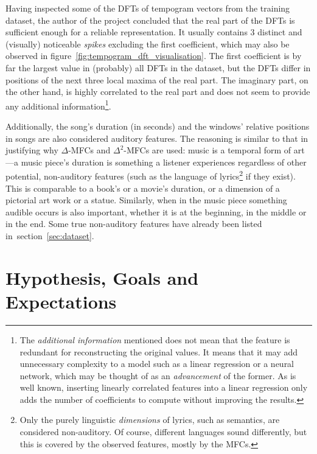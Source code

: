 \documentclass[conference, a4paper, 12pt]{IEEEtran}
\begin{document}
    \par

    Having inspected some of the DFTs of tempogram vectors from the training dataset, the author of the project concluded that the real part of the DFTs is sufficient enough for a reliable representation. It usually contains $ 3 $ distinct and (visually) noticeable \emph{spikes} excluding the first coefficient, which may also be observed in figure~\ref{fig:tempogram_dft_visualisation}. The first coefficient is by far the largest value in (probably) all DFTs in the dataset, but the DFTs differ in positions of the next three local maxima of the real part. The imaginary part, on the other hand, is highly correlated to the real part and does not seem to provide any additional information\footnote{The \emph{additional information} mentioned does not mean that the feature is redundant for reconstructing the original values. It means that it may add unnecessary complexity to a model such as a linear regression or a neural network, which may be thought of as an \emph{advancement} of the former. As is well known, inserting linearly correlated features into a linear regression only adds the number of coefficients to compute without improving the results.}.

    \par

    Additionally, the song's duration (in seconds) and the windows' relative positions in songs are also considered auditory features. The reasoning is similar to that in justifying why $ \Delta $-MFCs and $ \Delta^{2} $-MFCs are used: music is a temporal form of art---a music piece's duration is something a listener experiences regardless of other potential, non-auditory features (such as the language of lyrics\footnote{Only the purely linguistic \emph{dimensions} of lyrics, such as semantics, are considered non-auditory. Of course, different languages sound differently, but this is covered by the observed features, mostly by the MFCs.} if they exist). This is comparable to a book's or a movie's duration, or a dimension of a pictorial art work or a statue. Similarly, when in the music piece something audible occurs is also important, whether it is at the beginning, in the middle or in the end. Some true non-auditory features have already been listed in~section~\ref{sec:dataset}.

    \par

    \section{Hypothesis, Goals and Expectations}
    \label{sec:hypothesis_goals_and_expectations}
\end{document}
